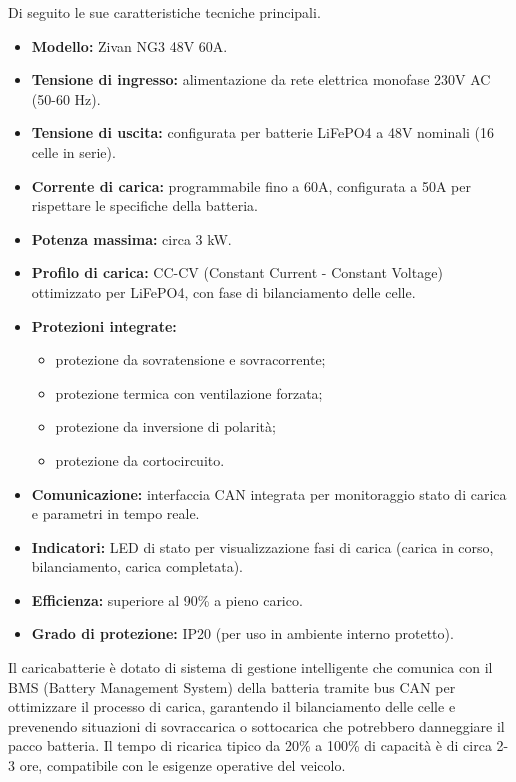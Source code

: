 Di seguito le sue caratteristiche tecniche principali.
\begin{itemize}
    \item \textbf{Modello:} Zivan NG3 48V 60A.
    \item \textbf{Tensione di ingresso:} alimentazione da rete elettrica monofase 230V AC (50-60 Hz).
    \item \textbf{Tensione di uscita:} configurata per batterie LiFePO4 a 48V nominali (16 celle in serie).
    \item \textbf{Corrente di carica:} programmabile fino a 60A, configurata a 50A per rispettare le specifiche della batteria.
    \item \textbf{Potenza massima:} circa 3 kW.
    \item \textbf{Profilo di carica:} CC-CV (Constant Current - Constant Voltage) ottimizzato per LiFePO4, con fase di bilanciamento delle celle.
    \item \textbf{Protezioni integrate:}
          \begin{itemize}
              \item protezione da sovratensione e sovracorrente;
              \item protezione termica con ventilazione forzata;
              \item protezione da inversione di polarità;
              \item protezione da cortocircuito.
          \end{itemize}
    \item \textbf{Comunicazione:} interfaccia CAN integrata per monitoraggio stato di carica e parametri in tempo reale.
    \item \textbf{Indicatori:} LED di stato per visualizzazione fasi di carica (carica in corso, bilanciamento, carica completata).
    \item \textbf{Efficienza:} superiore al 90\% a pieno carico.
    \item \textbf{Grado di protezione:} IP20 (per uso in ambiente interno protetto).
\end{itemize}

Il caricabatterie è dotato di sistema di gestione intelligente che comunica con il BMS (Battery Management System) della batteria tramite bus CAN per ottimizzare il processo di carica, garantendo il bilanciamento delle celle e prevenendo situazioni di sovraccarica o sottocarica che potrebbero danneggiare il pacco batteria. Il tempo di ricarica tipico da 20\% a 100\% di capacità è di circa 2-3 ore, compatibile con le esigenze operative del veicolo.

